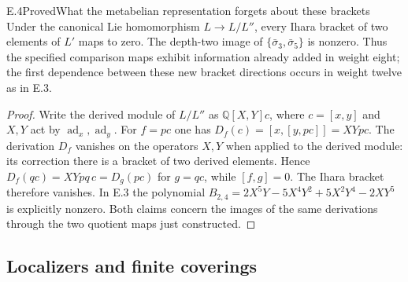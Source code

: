 \begin{statement}{E.4}{Proved}{What the metabelian representation forgets about these brackets}
Under the canonical Lie homomorphism $L\to L/L''$, every Ihara
bracket of two elements of $L'$ maps to zero. The depth-two image
of $\{\bar\sigma_3,\bar\sigma_5\}$ is nonzero. Thus the specified
comparison maps exhibit information already added in weight eight;
the first dependence between these new bracket directions occurs
in weight twelve as in E.3.
\end{statement}
\begin{proof}
Write the derived module of $L/L''$ as
$\mathbb Q[X,Y]c$, where $c=[x,y]$ and $X,Y$ act by
$\operatorname{ad}_x,\operatorname{ad}_y$. For $f=pc$ one has
$D_f(c)=[x,[y,pc]]=XYpc$. The derivation $D_f$ vanishes on the
operators $X,Y$ when applied to the derived module: its correction
there is a bracket of two derived elements. Hence
$D_f(qc)=XYpq\,c=D_g(pc)$ for $g=qc$, while $[f,g]=0$.
The Ihara bracket therefore vanishes. In E.3 the polynomial
$B_{2,4}=2X^5Y-5X^4Y^2+5X^2Y^4-2XY^5$ is explicitly nonzero.
Both claims concern the images of the same derivations through the
two quotient maps just constructed.
\end{proof}

\subsection{Localizers and finite coverings}


